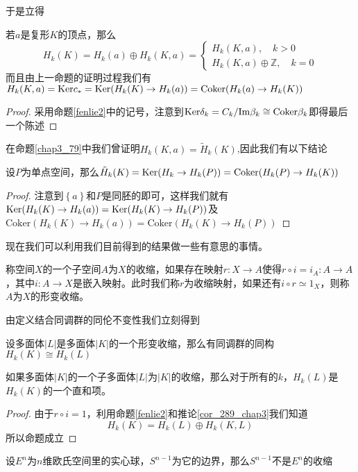 于是立得
\begin{corollary}\label{cor_289_chap3}
若$a$是复形$K$的顶点，那么$$H_{k}(K)=H_{k}(a)\oplus H_{k}(K,a)=\left\{\begin{array}{cc}
     H_{k}(K,a),\quad k>0  \\
     H_{k}(K,a)\oplus \mathbb{Z},\quad k=0 
\end{array}\right.$$而且由上一命题的证明过程我们有$H_{k}(K,a)={\rm Ker} c_{*}={\rm Ker}(H_{k}(K)\rightarrow H_{k}(a))=\text{Coker}(H_{k}(a)\rightarrow H_{k}(K))$
\end{corollary}
\begin{proof}
采用命题\eqref{fenlie2}中的记号，注意到${\rm Ker}\delta_{k}=C_{k}/{\rm Im}\beta_{k}\cong\text{Coker}\beta_{k}$即得最后一个陈述
\end{proof}
在命题\eqref{chap3_79}中我们曾证明$H_{k}(K,a)=\tilde{H}_{k}(K)$,因此我们有以下结论
\begin{corollary}
设$P$为单点空间，那么$\tilde{H}_{k}(K)={\rm Ker}(H_{k}\rightarrow H_{k}(P))=\text{Coker}(H_{k}(P)\rightarrow H_{k}(K))$
\end{corollary}
\begin{proof}
注意到$\left\{a\right\}$和$P$是同胚的即可，这样我们就有${\rm Ker}(H_{k}(K)\rightarrow H_{k}(a))={\rm Ker}(H_{k}(K)\rightarrow H_{k}(P))$及$\text{Coker}(H_{k}(K)\rightarrow H_{k}(a))=\text{Coker}(H_{k}(K)\rightarrow H_{k}(P))$
\end{proof}
现在我们可以利用我们目前得到的结果做一些有意思的事情。
\begin{definition}
称空间$X$的一个子空间$A$为$X$的收缩，如果存在映射$r:X\rightarrow A$使得$r\circ i=i_{A}:A\rightarrow A$，其中$i:A\rightarrow X$是嵌入映射。此时我们称$r$为收缩映射，如果还有$i\circ r\simeq 1_{X}$，则称$A$为$X$的形变收缩。
\end{definition}
由定义结合同调群的同伦不变性我们立刻得到
\begin{corollary}
设多面体$|L|$是多面体$|K|$的一个形变收缩，那么有同调群的同构$H_{k}(K)\cong H_{k}(L)$
\end{corollary}
\begin{proposition}
如果多面体$|K|$的一个子多面体$|L|$为$|K|$的收缩，那么对于所有的$k$，$H_{k}(L)$是$H_{k}(K)$的一个直和项。
\end{proposition}
\begin{proof}
由于$r\circ i=1$，利用命题\eqref{fenlie2}和推论\eqref{cor_289_chap3}我们知道$$H_{k}(K)=H_{k}(L)\oplus H_{k}(K,L)$$所以命题成立
\end{proof}
\begin{corollary}\label{chap3_319_cor}
设$E^{n}$为$n$维欧氏空间里的实心球，$S^{n-1}$为它的边界，那么$S^{n-1}$不是$E^{n}$的收缩
\end{corollary}
